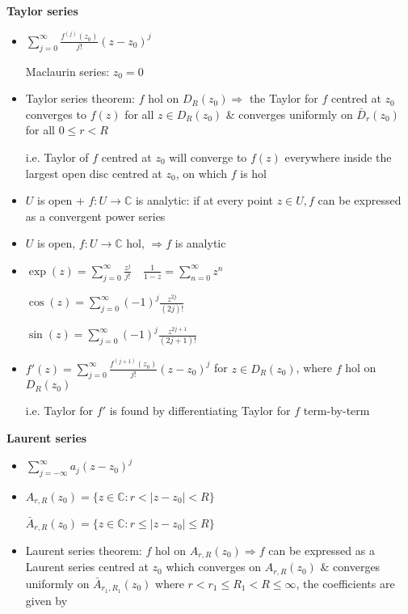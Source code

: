 \documentclass[10pt,a4paper]{article}
\begin{document}
\begin{multicols}{2}
\textbf{Taylor series}

\begin{itemize}
    \item $\sum_{j=0}^\infty \frac{f^{(j)}(z_0)}{j!} (z-z_0)^j$
  
  Maclaurin series: $z_0=0$
\item Taylor series theorem: $f$ hol on $D_R(z_0) \Rightarrow$ the Taylor for $f$ centred at $z_0$ converges to $f(z)$ for all $z\in D_R(z_0)$ \& converges uniformly on $\bar D_r(z_0)$ for all $0\leq r<R$
  
  i.e. Taylor of $f$ centred at $z_0$ will converge to $f(z)$ everywhere inside the largest open disc centred at $z_0$, on which $f$ is hol
\item $U$ is open + $f: U\to \mathbb C$ is analytic: if at every point $z\in U, f$ can be expressed as a convergent power series
\item $U$ is open, $f: U \to \mathbb C$ hol, $\Rightarrow f$ is analytic
\item 
  $\displaystyle \exp(z)= \sum_{j=0}^\infty \frac{z^j}{j!} \quad \frac{1}{1-z}= \sum_{n=0}^\infty z^n$
  
  $\displaystyle \cos(z)= \sum_{j=0}^\infty (-1)^j \frac{z^{2j}}{(2j)!}$

  $\displaystyle \sin(z)= \sum_{j=0}^\infty (-1)^j \frac{z^{2j+1}}{(2j+1)!}$
\item $\displaystyle f'(z)= \sum_{j=0}^\infty \frac{f^{(j+1)}(z_0)}{j!}(z-z_0)^j$ for $z\in D_R(z_0)$, where $f$ hol on $D_R(z_0)$

  i.e. Taylor for $f'$ is found by differentiating Taylor for $f$ term-by-term
\end{itemize}

\textbf{Laurent series}

\begin{itemize}
    \item $\sum_{j=-\infty}^\infty a_j(z-z_0)^j$
    \item $A_{r,R}(z_0)=\{ z\in \mathbb C: r<|z-z_0|<R \}$
    
      $\bar A_{r,R}(z_0)=\{ z\in \mathbb C: r\leq |z-z_0|\leq R \}$
    
    \item Laurent series theorem: $f$ hol on $A_{r,R}(z_0) \Rightarrow f$ can be expressed as a Laurent series centred at $z_0$ which converges on $A_{r,R}(z_0)$ \& converges uniformly on $\bar A_{r_1,R_1}(z_0)$ where $r<r_1\leq R_1<R \leq \infty$, the coefficients are given by
      

\end{itemize}
\end{multicols}
\end{document}
